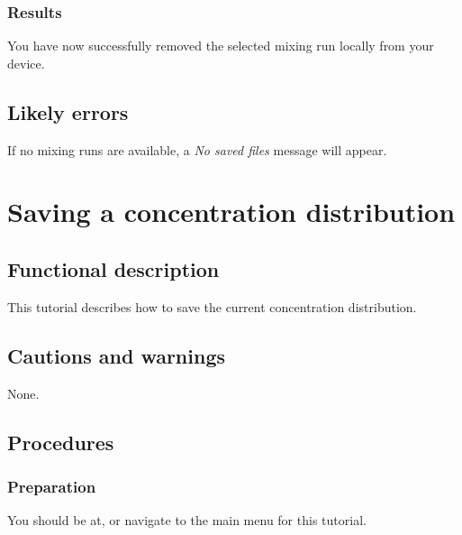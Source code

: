 \subsubsection{Results}
You have now successfully removed the selected mixing run locally from your device.

\subsection{Likely errors}
If no mixing runs are available, a \emph{No saved files} message will appear.


\section{Saving a concentration distribution}
\label{sec:savdist}

\subsection{Functional description}
This tutorial describes how to save the current concentration distribution.

\subsection{Cautions and warnings}
None.

\subsection{Procedures}

\subsubsection{Preparation}
You should be at, or navigate to the main menu for this tutorial.

